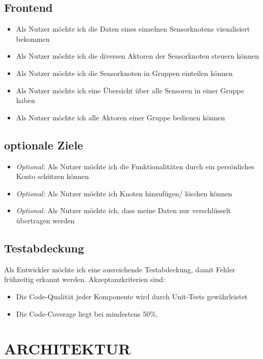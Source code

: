 \documentclass[letterpaper, 10 pt, conference]{ieeeconf}  %
\begin{document}
\subsection{Frontend}
\begin{itemize}
    \item Als Nutzer möchte ich die Daten eines einzelnen Sensorknotens visualisiert bekommen
    \item Als Nutzer möchte ich die diversen Aktoren der Sensorknoten steuern können
    \item Als Nutzer möchte ich die Sensorknoten in Gruppen einteilen können
    \item Als Nutzer möchte ich eine Übersicht über alle Sensoren in einer Gruppe haben
    \item Als Nutzer möchte ich alle Aktoren einer Gruppe bedienen können
\end{itemize}

\subsection{optionale Ziele}
\begin{itemize}
\item \textit{Optional:} Als Nutzer möchte ich die Funktionalitäten durch ein persönliches Konto schützen können
\item \textit{Optional:} Als Nutzer möchte ich Knoten hinzufügen/ löschen können
\item \textit{Optional:} Als Nutzer möchte ich, dass meine Daten nur verschlüsselt übertragen werden
	
\end{itemize}

\subsection{Testabdeckung}
Als Entwickler möchte ich eine ausreichende Testabdeckung, damit Fehler frühzeitig erkannt werden. Akzeptanzkriterien sind:
\begin{itemize}
\item Die Code-Qualität jeder Komponente wird durch Unit-Tests gewährleistet
\item Die Code-Coverage liegt bei mindestens 50\%.
\end{itemize}


\section{ARCHITEKTUR}
\end{document}
